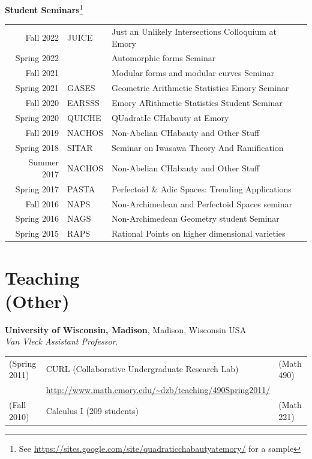 \documentclass[margin,line]{res}
\newcommand{\defi}[1]{\textsf{#1}} 				%
\begin{document}
\begin{resume}
{\bf Student Seminars}\footnote{See
  \url{https://sites.google.com/site/quadraticchabautyatemory/} for a sample}
\vspace*{-.1in}

\begin{tabular}{rll}
Fall 2022   & \defi{JUICE}   & Just an Unlikely Intersections Colloquium at Emory\\
Spring 2022 &    & Automorphic forms Seminar\\
  Fall 2021 &    & Modular forms and modular curves Seminar\\
Spring 2021 &   \defi{GASES} & Geometric Arithmetic Statistics Emory Seminar\\
Fall 2020 &   \defi{EARSSS} & Emory ARithmetic Statistics Student Seminar\\
Spring 2020 &   \defi{QUICHE} & QUadratIc CHabauty at Emory\\    
Fall 2019 &   \defi{NACHOS} & Non-Abelian CHabauty and Other Stuff\\
Spring 2018 &   \defi{SITAR} & Seminar on Iwasawa Theory And Ramification\\
Summer 2017 &   \defi{NACHOS} & Non-Abelian CHabauty and Other Stuff\\
Spring 2017 &   \defi{PASTA} & Perfectoid \& Adic Spaces: Trending Applications\\
Fall 2016 &   \defi{NAPS} & Non-Archimedean and Perfectoid Spaces seminar\\
Spring 2016 &   \defi{NAGS} & Non-Archimedean Geometry student Seminar\\
Spring 2015 &  \defi{RAPS} & Rational Points on higher dimensional varieties\\
\end{tabular}

\section{\sc Teaching \\ (Other)}

{\bf University of Wisconsin, Madison}, Madison, Wisconsin USA\\
\emph{Van Vleck Assistant Professor}. 
  \vspace*{-.1in}

  \begin{tabular}{lll}  
    (Spring 2011) &CURL (Collaborative Undergraduate Research Lab) &  (Math 490) \\
                  & \url{http://www.math.emory.edu/~dzb/teaching/490Spring2011/} &\\
(Fall 2010)& Calculus I (209 students) & (Math 221) 
  \end{tabular}
  



\end{resume}
\end{document}
